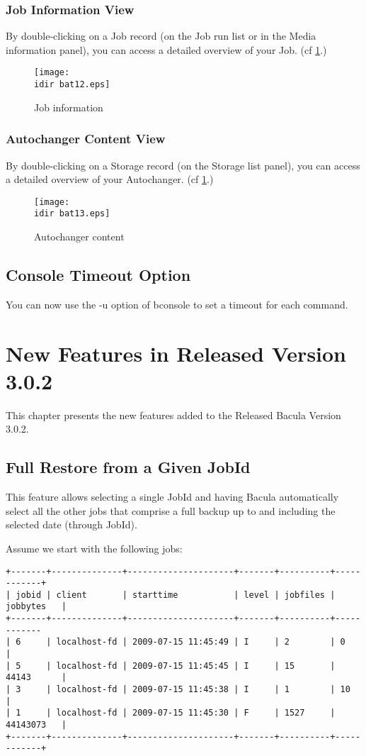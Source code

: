 \subsection{Job Information View}

By double-clicking on a Job record (on the Job run list or in the Media
information panel), you can access a detailed overview of your Job. (cf
\ref{fig:jobinfo}.)
\begin{figure}[htbp]
  \centering
  \texttt{[image: \\idir bat12.eps]}  
  \caption{Job information}
  \label{fig:jobinfo}
\end{figure}

\subsection{Autochanger Content View}

By double-clicking on a Storage record (on the Storage list panel), you can
access a detailed overview of your Autochanger. (cf \ref{fig:jobinfo}.)
\begin{figure}[htbp]
  \centering
  \texttt{[image: \\idir bat13.eps]}  
  \caption{Autochanger content}
  \label{fig:achcontent}
\end{figure}

\section{Console Timeout Option}
You can now use the -u option of bconsole to set a timeout for each command.

\chapter{New Features in Released Version 3.0.2}

This chapter presents the new features added to the
Released Bacula Version 3.0.2.

\section{Full Restore from a Given JobId}

This feature allows selecting a single JobId and having Bacula
automatically select all the other jobs that comprise a full backup up to
and including the selected date (through JobId).

Assume we start with the following jobs:
\begin{verbatim}
+-------+--------------+---------------------+-------+----------+------------+
| jobid | client       | starttime           | level | jobfiles | jobbytes   |
+-------+--------------+---------------------+-------+----------+------------
| 6     | localhost-fd | 2009-07-15 11:45:49 | I     | 2        | 0          |
| 5     | localhost-fd | 2009-07-15 11:45:45 | I     | 15       | 44143      |
| 3     | localhost-fd | 2009-07-15 11:45:38 | I     | 1        | 10         |
| 1     | localhost-fd | 2009-07-15 11:45:30 | F     | 1527     | 44143073   |
+-------+--------------+---------------------+-------+----------+------------+
\end{verbatim}

